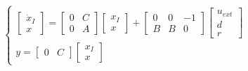		\begin{equation}
			\begin{cases}
				\begin{bmatrix}
					\dot{x}_I \\
					x
				\end{bmatrix}
				=
				\begin{bmatrix}
					0 & C \\
					0 & A
				\end{bmatrix}
				\begin{bmatrix}
					x_I \\
					x
				\end{bmatrix}
				+
				\begin{bmatrix}
					0 & 0 & -1 \\
					B & B & 0
				\end{bmatrix}
				\begin{bmatrix}
					u_{ext} \\
					d       \\
					r
				\end{bmatrix} \\
				y=
				\begin{bmatrix}
					0 & C
				\end{bmatrix}
				\begin{bmatrix}
					x_I \\
					x
				\end{bmatrix}
			\end{cases}
		\end{equation}
	
	
	
	
	
	
	
	
	
	
	
	
	
	
	
	
	
	
	
	
	
	
	
	
	
	
	
	
	
	
			